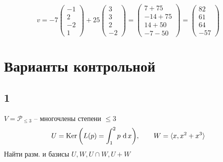 $$ v = -7
\begin{pmatrix}
	-1 \\
    2 \\
    -2 \\
    1
\end{pmatrix} + 25
\begin{pmatrix}
	3 \\
    3 \\
    2 \\
    -2
\end{pmatrix} =
\begin{pmatrix}
	7 + 75 \\
    -14 + 75 \\
    14 + 50 \\
    -7 - 50
\end{pmatrix} =
\begin{pmatrix}
	82 \\
    61 \\
    64 \\
    -57
\end{pmatrix} $$

\section{Варианты контрольной}

\subsection{1}

$ V = \mathcal{P}_{\le 3} $ -- многочлены степени $ \le 3 $
$$ U = \operatorname{Ker} \bigg( L(p) = \int_{1}^{2} {p} \, \operatorname{d} {x} \bigg), \qquad W = \braket{x, x^2 + x^3} $$
Найти разм. и базисы $ U, W, U \cap W, U + W $

